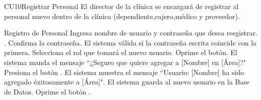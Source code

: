 
% 



	\begin{UseCase}{CU10}{Registrar Personal}{
		El director de la clínica se encargará de registrar al personal nuevo dentro de la clínica (dependiente,cajero,médico y proveedor).
	}
	\end{UseCase}

	\begin{UCtrayectoria}{Registro de Personal}
		\UCpaso[\UCactor] Ingresa nombre de usuario y contraseña que desea resgistrar. \label{CU10RegistroPersonal}.
		\UCpaso[\UCactor] Confirma la contraseña.
		\UCpaso El sistema válida si la contraseña escrita coincide con la primera.
		\UCpaso[\UCactor]Selecciona el rol que tomará el nuevo usuario.
		\UCpaso[\UCactor] Oprime el botón.
		\UCpaso El sistema manda el mensaje ``¿Seguro que quiere agregar a [Nombre] en [Área]?"
		\UCpaso[\UCactor] Presiona el botón .
		\UCpaso El sistema muestra el mensaje ``Usuario: [Nombre] ha sido agregado éxitosamente a [Área]".
		\UCpaso El sistema guarda al nuevo usuario en la Base de Datos. 
		\UCpaso[\UCactor]Oprime el botón .
	\end{UCtrayectoria}
		
